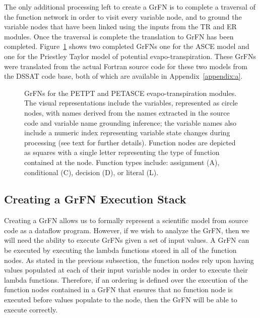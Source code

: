 The only additional processing left to create a GrFN is to complete a traversal of the function network in order to visit every variable node, and to ground the variable nodes that have been linked using the inputs from the TR and ER modules.
Once the traversal is complete the translation to GrFN has been completed.
Figure~\ref{fig:grfn_cgs} shows two completed GrFNs one for the ASCE model and one for the Priestley Taylor model of potential evapo-transpiration.
These GrFNs were translated from the actual Fortran source code for these two models from the DSSAT code base, both of which are available in Appendix~\ref{appendix:a}.

\begin{figure}[!htbp]
  \centering
  \hfill
  \caption[Evapo-transpiration GrFN Examples]{GrFNs for the PETPT and PETASCE evapo-transpiration modules. The visual representations include the variables, represented as circle nodes, with names derived from the names extracted in the source code and variable name grounding inference; the variable names also include a numeric index representing variable state changes during processing (see text for further details). Function nodes are depicted as squares with a single letter representing the type of function contained at the node. Function types include: assignment (A), conditional (C), decision (D), or literal (L).}
  \label{fig:grfn_cgs}
\end{figure}

\subsection{Creating a GrFN Execution Stack \label{sec:exec_stack_creation}}
Creating a GrFN allows us to formally represent a scientific model from source code as a dataflow program.
However, if we wish to analyze the GrFN, then we will need the ability to execute GrFNs given a set of input values.
A GrFN can be executed by executing the lambda functions stored in all of the function nodes.
As stated in the previous subsection, the function nodes rely upon having values populated at each of their input variable nodes in order to execute their lambda functions.
Therefore, if an ordering is defined over the execution of the function nodes contained in a GrFN that ensures that no function node is executed before values populate to the node, then the GrFN will be able to execute correctly.

